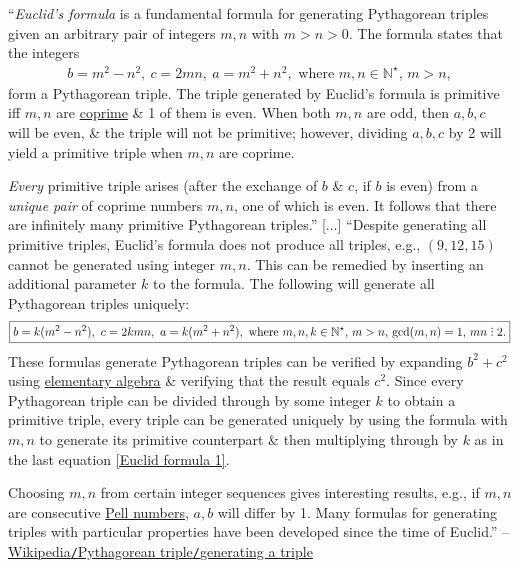 \documentclass{article}
\DeclareRobustCommand{\divby}{%
	\mathrel{\vbox{\baselineskip.65ex\lineskiplimit0pt\hbox{.}\hbox{.}\hbox{.}}}%
}
\begin{document}
``\textit{Euclid's formula} is a fundamental formula for generating Pythagorean triples given an arbitrary pair of integers $m,n$ with $m > n > 0$. The formula states that the integers
\begin{align}
	\label{Euclid formula}
	\boxed{b = m^2 - n^2,\ c = 2mn,\ a = m^2 + n^2,\mbox{ where } m,n\in\mathbb{N}^\star,\,m > n,}
\end{align}
form a Pythagorean triple. The triple generated by Euclid's formula is primitive iff $m,n$ are \href{https://en.wikipedia.org/wiki/Coprime}{coprime} \& 1 of them is even. When both $m,n$ are odd, then $a,b,c$ will be even, \& the triple will not be primitive; however, dividing $a,b,c$ by 2 will yield a primitive triple when $m,n$ are coprime.

\textit{Every} primitive triple arises (after the exchange of $b$ \& $c$, if $b$ is even) from a \textit{unique pair} of coprime numbers $m,n$, one of which is even. It follows that there are infinitely many primitive Pythagorean triples.'' [$\ldots$] ``Despite generating all primitive triples, Euclid's formula does not produce all triples, e.g., $(9,12,15)$ cannot be generated using integer $m,n$. This can be remedied by inserting an additional parameter $k$ to the formula. The following will generate all Pythagorean triples uniquely:
\begin{align}
	\label{Euclid formula 1}
	\boxed{b = k(m^2 - n^2),\ c = 2kmn,\ a = k(m^2 + n^2),\mbox{ where } m,n,k\in\mathbb{N}^\star,\,m > n,\,{\rm gcd}(m,n) = 1,\,mn\divby2.}
\end{align}
These formulas generate Pythagorean triples can be verified by expanding $b^2 + c^2$ using \href{https://en.wikipedia.org/wiki/Elementary_algebra}{elementary algebra} \& verifying that the result equals $c^2$. Since every Pythagorean triple can be divided through by some integer $k$ to obtain a primitive triple, every triple can be generated uniquely by using the formula with $m,n$ to generate its primitive counterpart \& then multiplying through by $k$ as in the last equation \eqref{Euclid formula 1}.

Choosing $m,n$ from certain integer sequences gives interesting results, e.g., if $m,n$ are consecutive \href{https://en.wikipedia.org/wiki/Pell_number}{Pell numbers}, $a,b$ will differ by 1. Many formulas for generating triples with particular properties have been developed since the time of Euclid.'' -- \href{https://en.wikipedia.org/wiki/Pythagorean_triple#Generating_a_triple}{Wikipedia{\tt/}Pythagorean triple{\tt/}generating a triple}
\end{document}
